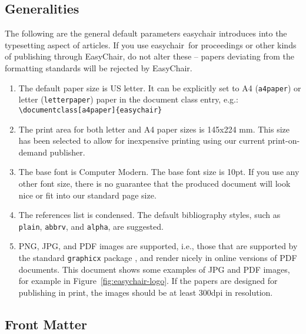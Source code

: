 \documentclass[withtimes]{easychair}
\newcommand{\easychair}{\textsf{easychair}}
\begin{document}
\subsection{Generalities}
\label{sect:generalities}

The following are the general default parameters {\easychair}
introduces into the typesetting aspect of articles. If you use
\easychair\ for proceedings or other kinds of publishing through
EasyChair, do not alter these -- papers deviating from the formatting
standards will be rejected by EasyChair.

\begin{enumerate}
\item
The default paper size is US letter. It can be explicitly set to A4 
(\texttt{a4paper}) or letter (\texttt{letterpaper}) paper in the
document class entry, e.g.:\\\verb+\documentclass[a4paper]{easychair}+

\item
The print area for both letter and A4 paper sizes is 145x224 mm. This size
has been selected to allow for inexpensive printing using our current
print-on-demand publisher.

\item
The base font is Computer Modern. The base font size is 10pt. If you
use any other font size, there is no guarantee that the produced
document will look nice or fit into our standard page size.

\item
The references list is condensed. The default bibliography styles, such as
\texttt{plain}, \texttt{abbrv}, and \texttt{alpha}, are suggested.

\item
PNG, JPG, and PDF images are supported, i.e., those that are supported
by the standard \texttt{graphicx} package \cite{graphicx-package}, and
render nicely in online versions of PDF documents.  This document
shows some examples of JPG and PDF images, for example in
Figure~\ref{fig:easychair-logo}. If the papers are designed for
publishing in print, the images should be at least 300dpi in
resolution. 

\end{enumerate}

\subsection{Front Matter}
\label{sect:front-matter}
\end{document}
